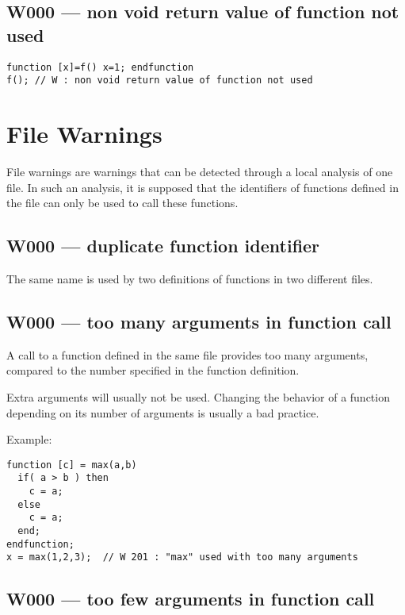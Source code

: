 \subsection{W000 --- non void return value of function not used}


\begin{verbatim}
function [x]=f() x=1; endfunction
f(); // W : non void return value of function not used

\end{verbatim}


\section{File Warnings}

File warnings are warnings that can be detected through a local
analysis of one file. In such an analysis, it is supposed that the
identifiers of functions defined in the file can only be used to call
these functions.

\subsection{W000 --- duplicate function identifier}




The same name is used by two definitions of functions in two different
files.



\subsection{W000 --- too many arguments in function call}




A call to a function defined in the same file provides too many
arguments, compared to the number specified in the function definition.



Extra arguments will usually not be used. Changing the behavior of a
function depending on its number of arguments is usually a bad
practice.



Example:\begin{verbatim}
function [c] = max(a,b)
  if( a > b ) then
    c = a;
  else
    c = a;
  end;
endfunction;
x = max(1,2,3);  // W 201 : "max" used with too many arguments
\end{verbatim}




\subsection{W000 --- too few arguments in function call }





